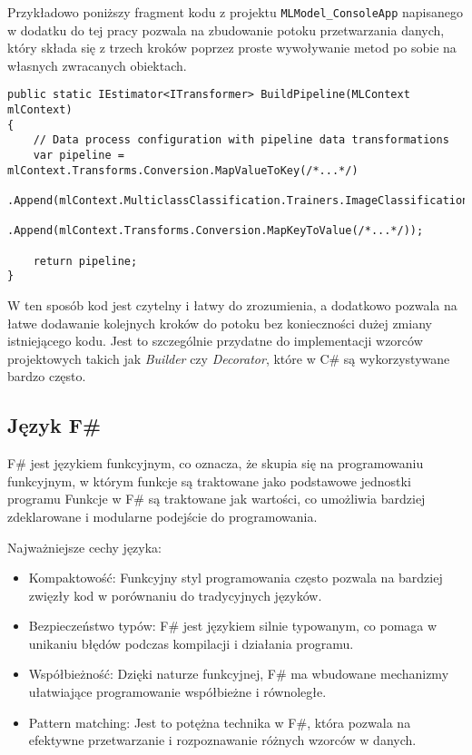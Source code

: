 Przykładowo poniższy fragment kodu z projektu \lstinline{MLModel_ConsoleApp} napisanego w dodatku do tej pracy pozwala na zbudowanie potoku przetwarzania danych, który składa się z trzech kroków poprzez proste wywoływanie metod po sobie na własnych zwracanych obiektach.

\begin{lstlisting}[language={[Sharp]C}]
public static IEstimator<ITransformer> BuildPipeline(MLContext mlContext)
{
    // Data process configuration with pipeline data transformations
    var pipeline = mlContext.Transforms.Conversion.MapValueToKey(/*...*/)
        .Append(mlContext.MulticlassClassification.Trainers.ImageClassification(/*...*/))
        .Append(mlContext.Transforms.Conversion.MapKeyToValue(/*...*/));

    return pipeline;
}
\end{lstlisting}

W ten sposób kod jest czytelny i łatwy do zrozumienia, a dodatkowo pozwala na łatwe dodawanie kolejnych kroków do potoku bez konieczności dużej zmiany istniejącego kodu.
Jest to szczególnie przydatne do implementacji wzorców projektowych takich jak \emph{Builder} czy \emph{Decorator}, które w C\# są wykorzystywane bardzo często.

\subsection{Język F\#}

F\# jest językiem funkcyjnym, co oznacza, że skupia się na programowaniu funkcyjnym, w którym funkcje są traktowane jako podstawowe jednostki programu
Funkcje w F\# są traktowane jak wartości, co umożliwia bardziej zdeklarowane i modularne podejście do programowania.

Najważniejsze cechy języka:

\begin{itemize}

  \item Kompaktowość: Funkcyjny styl programowania często pozwala na bardziej zwięzły kod w porównaniu do tradycyjnych języków.

  \item Bezpieczeństwo typów: F\# jest językiem silnie typowanym, co pomaga w unikaniu błędów podczas kompilacji i działania programu.

  \item Współbieżność: Dzięki naturze funkcyjnej, F\# ma wbudowane mechanizmy ułatwiające programowanie współbieżne i równoległe.

  \item Pattern matching: Jest to potężna technika w F\#, która pozwala na efektywne przetwarzanie i rozpoznawanie różnych wzorców w danych.

\end{itemize}

